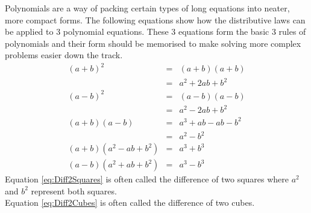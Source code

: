 Polynomials are a way of packing certain types of long equations into neater,
more compact forms. The following equations show how the distributive laws can
be applied to 3 polynomial equations. These 3 equations form the basic 3 rules
of polynomials and their form should be memorised to make solving more complex
problems easier down the track.
\begin{align}
  {(a+b)}^{2} & = & (a+b)(a+b) \nonumber \\
              & = & {a}^{2} + 2ab + {b}^{2} \label{eq:poly0} \\
  {(a-b)}^{2} & = & (a-b)(a-b) \nonumber \\
              & = & {a}^{2} - 2ab + {b}^{2} \label{eq:poly1} \\
  (a+b)(a-b)  & = & {a}^{3} + ab - ab - {b}^{2} \nonumber \\ 
              & = & {a}^{2} - {b}^{2} \label{eq:Diff2Squares} \\
  (a+b)({a}^{2} - ab + {b}^{2}) & = & {a}^{3} + {b}^{3} \label{eq:Sum2Cubes} \\
  (a-b)({a}^{2} + ab + {b}^{2}) & = & {a}^{3} - {b}^{3} \label{eq:Diff2Cubes}
\end{align}
Equation \ref{eq:Diff2Squares} is often called the difference of two squares where
${a}^{2}$ and ${b}^{2}$ represent both squares. \\
Equation \ref{eq:Diff2Cubes} is often called the difference of two cubes.
